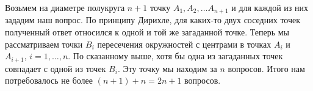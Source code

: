 \documentclass{article}
\begin{document}
Возьмем на диаметре полукруга $n+1$ точку $A_1,A_2, \ldots A_{n+1}$ и для каждой из них зададим наш вопрос. По принципу Дирихле, для каких-то двух соседних точек полученный ответ относился к одной и той же загаданной точке. Теперь мы рассматриваем точки $B_i$ пересечения окружностей с центрами в точках $A_i$ и $A_{i+1}$, $i=1,\ldots,n$. По сказанному выше, хотя бы одна из загаданных точек совпадает с одной из точек $B_i$. Эту точку мы находим за $n$ вопросов. Итого нам потребовалось не более $(n+1)+n=2n+1$ вопросов.
\end{document}
